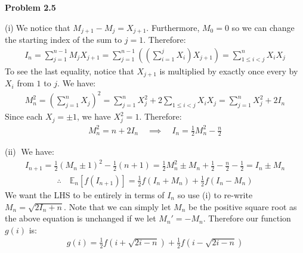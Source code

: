 \documentclass[12pt, letterpaper]{article}
\begin{document}
\rightline{$\square$}

\vspace{5mm}
\noindent
\textbf{Problem 2.5}

\vspace{5mm}
\noindent
(i)$\;$We notice that $M_{j+1} - M_j = X_{j+1}$. Furthermore, $M_0 = 0$ so we can change the starting index of the sum to $j=1$. Therefore:
\begin{gather*}
    I_n = \sum_{j=1}^{n-1} M_j X_{j+1} = \sum_{j=1}^{n-1} \left( \left(\sum_{i=1}^j X_i \right) X_{j+1}\right) = \sum_{1 \leq i < j}^{n} X_i X_j
\end{gather*}
To see the last equality, notice that $X_{j+1}$ is multiplied by exactly once every by $X_i$ from $1$ to $j$.
We have:
\begin{gather*}
    M_n^2 = \left( \sum_{j=1}^n X_j \right)^2 = \sum_{j=1}^n X_j^2 + 2 \sum_{1 \leq i < j} X_i X_j = \sum_{j=1}^n X_j^2 + 2I_n
\end{gather*}
Since each $X_j = \pm 1$, we have $X_j^2 = 1$. Therefore:
\begin{gather*}
    M_n^2 = n + 2I_n \quad \implies \quad I_n = \tfrac 1 2 M_n^2 - \tfrac n 2
\end{gather*}

\rightline{$\square$}

\vspace{5mm}
\noindent
(ii)$\;$ We have:
\begin{gather*}
    I_{n+1} = \tfrac{1}{2} \left( M_n \pm 1\right)^2 - \tfrac 1 2 (n+1) = \tfrac 1 2 M_n^2 \pm M_n + \tfrac 1 2 - \tfrac n 2 - \tfrac 1 2 = I_n \pm M_n
\end{gather*}
\begin{gather*}
    \therefore \quad \mathbb E_n \left[ f \left( I_{n+1} \right) \right] = \tfrac 1 2 f(I_n + M_n) + \tfrac 1 2 f(I_n - M_n)
\end{gather*}
We want the LHS to be entirely in terms of $I_n$ so use (i) to re-write $M_n = \sqrt{2I_n + n}$.
Note that we can simply let $M_n$ be the positive square root as the above equation is unchanged if we let $M_n' = -M_n$.
Therefore our function $g(i)$ is:
\begin{gather*}
    g(i) = \tfrac 1 2 f \left( i + \sqrt{2i - n} \right) + \tfrac 1 2 f \left( i - \sqrt{2i - n} \right)
\end{gather*}

\rightline{$\square$}
\end{document}
